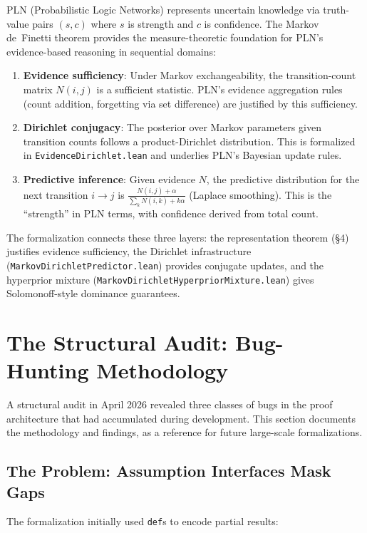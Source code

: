 \documentclass[11pt,a4paper]{article}
\theoremstyle{definition}
\begin{document}
PLN (Probabilistic Logic Networks) represents uncertain knowledge via
truth-value pairs $(s, c)$ where $s$ is strength and $c$ is confidence.
The Markov de~Finetti theorem provides the measure-theoretic foundation
for PLN's evidence-based reasoning in sequential domains:

\begin{enumerate}
\item \textbf{Evidence sufficiency}: Under Markov exchangeability,
  the transition-count matrix $N(i,j)$ is a sufficient statistic.
  PLN's evidence aggregation rules (count addition, forgetting via
  set difference) are justified by this sufficiency.
\item \textbf{Dirichlet conjugacy}: The posterior over Markov parameters
  given transition counts follows a product-Dirichlet distribution.
  This is formalized in \texttt{EvidenceDirichlet.lean} and underlies
  PLN's Bayesian update rules.
\item \textbf{Predictive inference}: Given evidence $N$, the predictive
  distribution for the next transition $i \to j$ is
  $\frac{N(i,j) + \alpha}{\sum_k N(i,k) + k\alpha}$ (Laplace smoothing).
  This is the ``strength'' in PLN terms, with confidence derived from
  total count.
\end{enumerate}

The formalization connects these three layers: the representation theorem
(\S4) justifies evidence sufficiency, the Dirichlet infrastructure
(\texttt{MarkovDirichletPredictor.lean}) provides conjugate updates,
and the hyperprior mixture (\texttt{MarkovDirichletHyperpriorMixture.lean})
gives Solomonoff-style dominance guarantees.

\section{The Structural Audit: Bug-Hunting Methodology}
\label{sec:audit}

A structural audit in April 2026 revealed three classes of bugs in the
proof architecture that had accumulated during development. This section
documents the methodology and findings, as a reference for future
large-scale formalizations.

\subsection{The Problem: Assumption Interfaces Mask Gaps}

The formalization initially used \texttt{def}s to encode partial results:
\end{document}

